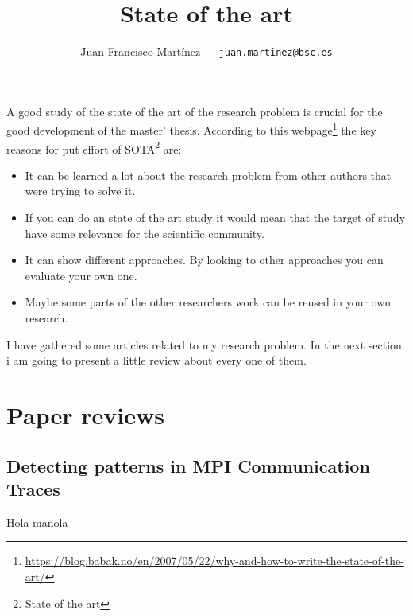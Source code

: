 \documentclass[12pt]{article}
\title{
	State of the art
}
\author{
	Juan Francisco Martínez --- \texttt{juan.martinez@bsc.es}
}
\begin{document}
\maketitle

A good study of the state of the art of the research problem is crucial for the good development of the master' thesis. According to this webpage\footnote{\url{https://blog.babak.no/en/2007/05/22/why-and-how-to-write-the-state-of-the-art/}} the key reasons for put effort of SOTA\footnote{State of the art} are:

\begin{itemize}
    \item It can be learned a lot about the research problem from other authors that were trying to solve it.
    \item If you can do an state of the art study it would mean that the target of study have some relevance for the scientific community.
    \item It can show different approaches. By looking to other approaches you can evaluate your own one.
    \item Maybe some parts of the other researchers work can be reused in your own research.
\end{itemize}

I have gathered some articles related to my research problem. In the next section i am going to present a little review about every one of them.

\section{Paper reviews}
\subsection{Detecting patterns in MPI Communication Traces}

Hola manola
\end{document}
